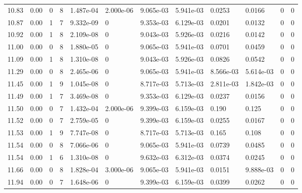 \documentclass[preview]{standalone}
\begin{document}
{{{{\begin{tabular}{L{1.2cm}C{1.2cm} C{0.3cm}C{0.5cm} C{1.4cm}C{1.4cm} C{1.4cm}C{1.4cm} C{1.6cm}C{1.6cm} C{1.6cm}C{1.6cm}}
  10.83  &  0.00  & 0     &  8 &  1.487e-04  & 2.000e-06  &  9.065e-03&   5.941e-03& 0.0253 & 0.0166   &  0 & 0  \\ 
  10.87  &  0.00  & 1     &  7 &  9.332e-09  & 0  &  9.353e-03&   6.129e-03& 0.0201 & 0.0132   &  0 & 0  \\ 
  10.92  &  0.00  & 1     &  8 &  2.109e-08  & 0  &  9.043e-03&   5.926e-03& 0.0216 & 0.0142   &  0 & 0  \\ 
  11.00  &  0.00  & 0     &  8 &  1.880e-05  & 0  &  9.065e-03&   5.941e-03& 0.0701 & 0.0459   &  0 & 0  \\ 
  11.09  &  0.00  & 1     &  8 &  1.310e-08  & 0  &  9.043e-03&   5.926e-03& 0.0826 & 0.0542   &  0 & 0  \\ 
  11.29  &  0.00  & 0     &  8 &  2.465e-06  & 0  &  9.065e-03&   5.941e-03& 8.566e-03 & 5.614e-03   &  0 & 0  \\ 
  11.45  &  0.00  & 1     &  9 &  1.045e-08  & 0  &  8.717e-03&   5.713e-03& 2.811e-03 & 1.842e-03   &  0 & 0  \\ 
  11.49  &  0.00  & 1     &  7 &  3.469e-08  & 0  &  9.353e-03&   6.129e-03& 0.0237 & 0.0156   &  0 & 0  \\ 
  11.50  &  0.00  & 0     &  7 &  1.432e-04  & 2.000e-06  &  9.399e-03&   6.159e-03& 0.190 & 0.125   &  0 & 0  \\ 
  11.52  &  0.00  & 0     &  7 &  2.759e-05  & 0  &  9.399e-03&   6.159e-03& 0.0255 & 0.0167   &  0 & 0  \\ 
  11.53  &  0.00  & 1     &  9 &  7.747e-08  & 0  &  8.717e-03&   5.713e-03& 0.165 & 0.108   &  0 & 0  \\ 
  11.54  &  0.00  & 0     &  8 &  7.066e-06  & 0  &  9.065e-03&   5.941e-03& 0.0739 & 0.0485   &  0 & 0  \\ 
  11.54  &  0.00  & 1     &  6 &  1.310e-08  & 0  &  9.632e-03&   6.312e-03& 0.0374 & 0.0245   &  0 & 0  \\ 
  11.66  &  0.00  & 0     &  8 &  1.828e-04  & 3.000e-06  &  9.065e-03&   5.941e-03& 0.0151 & 9.888e-03   &  0 & 0  \\ 
  11.94  &  0.00  & 0     &  7 &  1.648e-06  & 0  &  9.399e-03&   6.159e-03& 0.0399 & 0.0262   &  0 & 0  \\ 
\hline 
\end{tabular} 

}}}}
\end{document}
